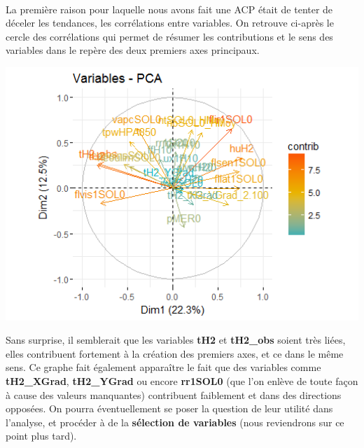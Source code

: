 \documentclass[14pt, openany]{article}
\begin{document}
\paragraph{}
La première raison pour laquelle nous avons fait une ACP était de tenter de déceler les tendances, les corrélations entre variables. On retrouve ci-après le cercle des corrélations qui permet de résumer les contributions et le sens des variables dans le repère des deux premiers axes principaux.
\begin{center}
\includegraphics[width=18cm]{Images/ACP.png}
\end{center}
Sans surprise, il semblerait que les variables \textbf{tH2} et \textbf{tH2\_obs} soient très liées, elles contribuent fortement à la création des premiers axes, et ce dans le même sens. Ce graphe fait également apparaître le fait que des variables comme \textbf{tH2\_XGrad}, \textbf{tH2\_YGrad} ou encore \textbf{rr1SOL0} (que l'on enlève de toute façon à cause des valeurs manquantes) contribuent faiblement et dans des directions opposées. On pourra éventuellement se poser la question de leur utilité dans l'analyse, et procéder à de la \textbf{sélection de variables} (nous reviendrons sur ce point plus tard).
\end{document}
